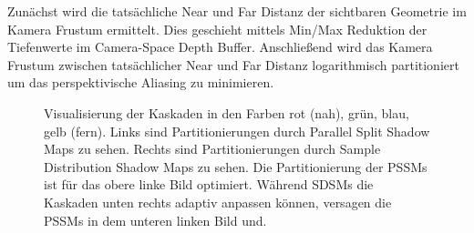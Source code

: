 \documentclass[runningheaders,a4paper]{llncs}
\begin{document}
Zunächst wird die tatsächliche Near und Far Distanz der sichtbaren Geometrie im Kamera Frustum ermittelt.
Dies geschieht mittels Min/Max Reduktion der Tiefenwerte im Camera-Space Depth Buffer.
Anschließend wird das Kamera Frustum zwischen tatsächlicher Near und Far Distanz logarithmisch partitioniert um das perspektivische Aliasing zu minimieren.


\begin{figure}[H]
	\centering
	
	
	\caption{
		Visualisierung der Kaskaden in den Farben rot (nah), grün, blau, gelb (fern).
		Links sind Partitionierungen durch Parallel Split Shadow Maps zu sehen.
		Rechts sind Partitionierungen durch Sample Distribution Shadow Maps zu sehen.
		Die Partitionierung der PSSMs ist für das obere linke Bild optimiert.
		Während SDSMs die Kaskaden unten rechts adaptiv anpassen können, versagen die PSSMs in dem unteren linken Bild und.
	}
\end{figure}
\end{document}

